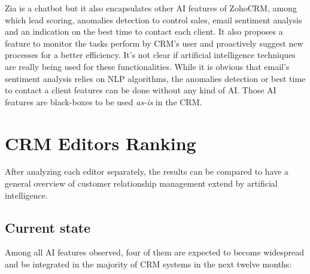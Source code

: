 Zia is a chatbot but it also encapsulates other AI features of ZohoCRM, among which lead scoring, anomalies detection to control sales, email sentiment analysis and an indication on the best time to contact each client. It also proposes a feature to monitor the tasks perform by CRM's user and proactively suggest new processes for a better efficiency. It's not clear if artificial intelligence techniques are really being used for these functionalities. While it is obvious that email's sentiment analysis relies on NLP algorithms, the anomalies detection or best time to contact a client features can be done without any kind of AI. Those AI features are black-boxes to be used \textit{as-is} in the CRM.


\section{CRM Editors Ranking}
After analyzing each editor separately, the results can be compared to have a general overview of customer relationship management extend by artificial intelligence.

\subsection{Current state}
Among all AI features observed, four of them are expected to become widespread and be integrated in the majority of CRM systems in the next twelve months:

